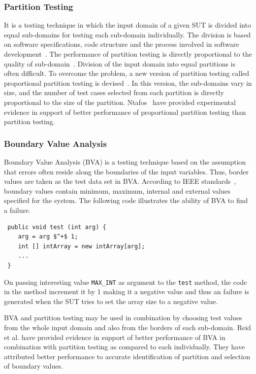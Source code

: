\subsubsection{Partition Testing}
It is a testing technique in which the input domain of a given SUT is divided into equal sub-domains for testing each sub-domain individually. The division is based on software specifications, code structure and the process involved in software development~\cite{hamlet1990partition}. The performance of partition testing is directly proportional to the quality of sub-domain~\cite{weyuker1991analyzing}. Division of the input domain into equal partitions is often difficult. To overcome the problem, a new version of partition testing called proportional partition testing is devised~\cite{chan1996proportional}. In this version, the sub-domains vary in size, and the number of test cases selected from each partition is directly proportional to the size of the partition. Ntafos~\cite{ntafos1998random} have provided experimental evidence in support of better performance of proportional partition testing than partition testing.


\subsubsection{Boundary Value Analysis}
Boundary Value Analysis (BVA) is a testing technique based on the assumption that errors often reside along the boundaries of the input variables. Thus, border values are taken as the test data set in BVA. According to IEEE standards~\cite{radatz1990ieee}, boundary values contain minimum, maximum, internal and external values specified for the system.
The following code illustrates the ability of BVA to find a failure. 
\bigskip
\begin{lstlisting}
 public void test (int arg) {
	arg = arg $^+$ 1;
	int [] intArray = new intArray[arg];
	...
 }
\end{lstlisting}
\bigskip
On passing interesting value \verb+MAX_INT+ as argument to the \verb+test+ method, the code in the method increment it by 1 making it a negative value and thus an failure is generated when the SUT tries to set the array size to a negative value.

BVA and partition testing may be used in combination by choosing test values from the whole input domain and also from the borders of each sub-domain. Reid et al. \cite{reid1997empirical} have provided evidence in support of better performance of BVA in combination with partition testing as compared to each individually. They have attributed better performance to accurate identification of partition and selection of boundary values. 


